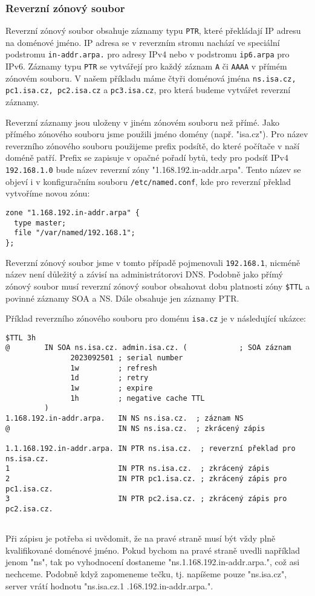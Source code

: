 \subsubsection{Reverzní zónový soubor}
Reverzní zónový soubor obsahuje záznamy typu {\tt PTR}, které překládají IP adresu na doménové jméno. IP adresa se v reverzním stromu nachází ve speciální podstromu {\tt in-addr.arpa.} pro adresy IPv4 nebo v podstromu {\tt ip6.arpa} pro IPv6. Záznamy typu {\tt PTR} se vytvářejí pro každý záznam {\tt A} či {\tt AAAA} v přímém zónovém souboru. V našem příkladu máme čtyři doménová jména {\tt ns.isa.cz, pc1.isa.cz, pc2.isa.cz} a {\tt pc3.isa.cz}, pro která budeme vytvářet reverzní záznamy. 

Reverzní záznamy jsou uloženy v jiném zónovém souboru než přímé. Jako přímého zónového souboru jsme použili jméno domény (např. "isa.cz"). Pro název reverzního zónového souboru použijeme prefix podsítě, do které počítače v naší doméně patří. Prefix se zapisuje v opačné pořadí bytů, tedy pro podsíť IPv4 {\tt 192.168.1.0} bude název reverzní zóny "1.168.192.in-addr.arpa". Tento název se objeví i v konfiguračním souboru {\tt /etc/named.conf}, kde pro reverzní překlad vytvoříme novou zónu:
\begin{verbatim}
zone "1.168.192.in-addr.arpa" {
  type master;
  file "/var/named/192.168.1";
};
\end{verbatim}        
Reverzní zónový soubor jsme v tomto případě pojmenovali {\tt 192.168.1}, nicméně název není důležitý a závisí na administrátorovi DNS. Podobně jako přímý zónový soubor musí reverzní zónový soubor obsahovat dobu platnosti zóny {\tt \$TTL} a povinné záznamy SOA a NS. Dále obsahuje jen záznamy PTR.

Příklad reverzního zónového souboru pro doménu {\tt isa.cz} je v následující ukázce:
\begin{verbatim}
$TTL 3h
@        IN SOA ns.isa.cz. admin.isa.cz. (            ; SOA záznam
               2023092501 ; serial number
               1w         ; refresh
               1d         ; retry 
               1w         ; expire
               1h         ; negative cache TTL
         )
1.168.192.in-addr.arpa.   IN NS ns.isa.cz.  ; záznam NS
@                         IN NS ns.isa.cz.  ; zkrácený zápis

1.1.168.192.in-addr.arpa. IN PTR ns.isa.cz.  ; reverzní překlad pro ns.isa.cz.
1                         IN PTR ns.isa.cz.  ; zkrácený zápis
2                         IN PTR pc1.isa.cz. ; zkrácený zápis pro pc1.isa.cz.
3                         IN PTR pc2.isa.cz. ; zkrácený zápis pro pc2.isa.cz.
                    
\end{verbatim}
Při zápisu je potřeba si uvědomit, že na pravé straně musí být vždy plně kvalifikované doménové jméno. Pokud bychom na pravé straně uvedli například jenom "ns", tak po vyhodnocení dostaneme "ns.1.168.192.in-addr.arpa.", což asi nechceme. Podobně když zapomeneme tečku, tj. napíšeme pouze "ns.isa.cz", server vrátí hodnotu "ns.isa.cz.1 .168.192.in-addr.arpa.". 

